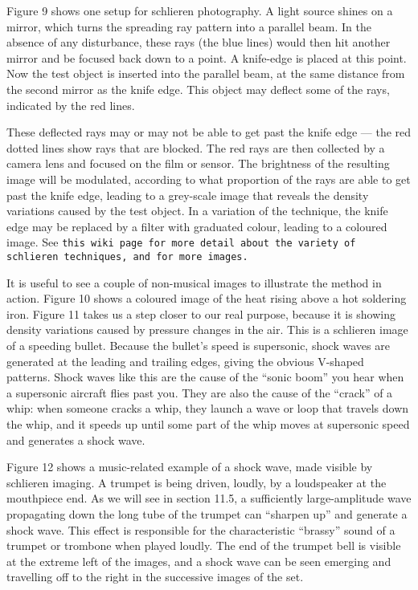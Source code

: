   Figure 9 shows one setup for schlieren photography. A light source shines on 
  a mirror, which turns the spreading ray pattern into a parallel beam. In the 
  absence of any disturbance, these rays (the blue lines) would then hit 
  another mirror and be focused back down to a point. A knife-edge is placed at 
  this point. Now the test object is inserted into the parallel beam, at the 
  same distance from the second mirror as the knife edge. This object may 
  deflect some of the rays, indicated by the red lines. 

  These deflected rays may or may not be able to get past the knife edge — the 
  red dotted lines show rays that are blocked. The red rays are then collected 
  by a camera lens and focused on the film or sensor. The brightness of the 
  resulting image will be modulated, according to what proportion of the rays 
  are able to get past the knife edge, leading to a grey-scale image that 
  reveals the density variations caused by the test object. In a variation of 
  the technique, the knife edge may be replaced by a filter with graduated 
  colour, leading to a coloured image. See \tt{}this wiki page\rm{} for more 
  detail about the variety of schlieren techniques, and for more images. 

  It is useful to see a couple of non-musical images to illustrate the method 
  in action. Figure 10 shows a coloured image of the heat rising above a hot 
  soldering iron. Figure 11 takes us a step closer to our real purpose, because 
  it is showing density variations caused by pressure changes in the air. This 
  is a schlieren image of a speeding bullet. Because the bullet’s speed is 
  supersonic, shock waves are generated at the leading and trailing edges, 
  giving the obvious V-shaped patterns. Shock waves like this are the cause of 
  the “sonic boom” you hear when a supersonic aircraft flies past you. They are 
  also the cause of the ``crack'' of a whip: when someone cracks a whip, they 
  launch a wave or loop that travels down the whip, and it speeds up until some 
  part of the whip moves at supersonic speed and generates a shock wave. 

  Figure 12 shows a music-related example of a shock wave, made visible by 
  schlieren imaging. A trumpet is being driven, loudly, by a loudspeaker at the 
  mouthpiece end. As we will see in section 11.5, a sufficiently 
  large-amplitude wave propagating down the long tube of the trumpet can 
  “sharpen up” and generate a shock wave. This effect is responsible for the 
  characteristic “brassy” sound of a trumpet or trombone when played loudly. 
  The end of the trumpet bell is visible at the extreme left of the images, and 
  a shock wave can be seen emerging and travelling off to the right in the 
  successive images of the set. 

